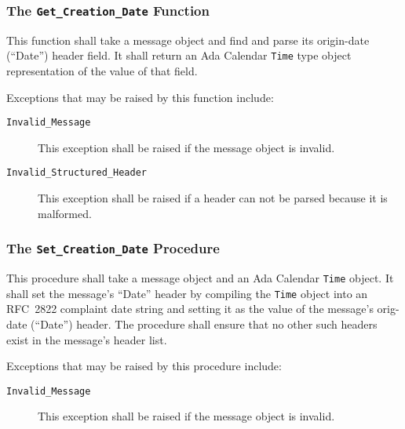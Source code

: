 \documentclass[11pt]{article}
\begin{document}
\subsubsection{The \texttt{Get\_Creation\_Date} Function}

This function shall take a message object and find and parse its
origin-date (``Date'') header field. It shall return an Ada Calendar
\texttt{Time} type object representation of the value of that field.

Exceptions that may be raised by this function include:

\begin{description}

\item[\texttt{Invalid\_Message}] This exception shall be raised if the
  message object is invalid.

\item[\texttt{Invalid\_Structured\_Header}] This exception shall be
  raised if a header can not be parsed because it is malformed.

\end{description}

\subsubsection{The \texttt{Set\_Creation\_Date} Procedure}

This procedure shall take a message object and an Ada Calendar
\texttt{Time} object. It shall set the message's ``Date'' header by
compiling the \texttt{Time} object into an RFC~2822 complaint date
string and setting it as the value of the message's orig-date
(``Date'') header. The procedure shall ensure that no other such
headers exist in the message's header list.

Exceptions that may be raised by this procedure include:

\begin{description}

\item[\texttt{Invalid\_Message}] This exception shall be raised if the
  message object is invalid.

\end{description}


\end{document}
